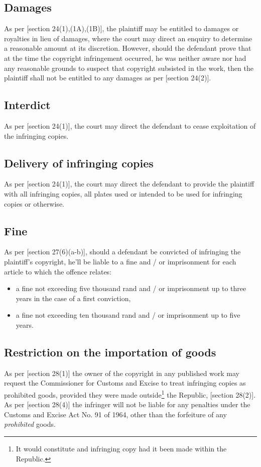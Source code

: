 \documentclass[11pt]{article}
\begin{document}
\subsection{Damages}
\label{sec:org50e3e7f}
As per [section 24(1),(1A),(1B)]\cite{rsa78_copyrightact}, the plaintiff
may be entitled to damages or royalties in lieu of damages, where the court
may direct an enquiry to determine a reasonable amount at its
discretion. However, should the defendant prove that at the time the
copyright infringement occurred, he was neither aware nor had any reasonable
grounds to suspect that copyright subsisted in the work, then the plaintiff
shall not be entitled to any damages as per [section 24(2)]\cite{rsa78_copyrightact}.
\subsection{Interdict}
\label{sec:org68ed5d1}
As per [section 24(1)]\cite{rsa78_copyrightact}, the court may direct the
defendant to cease exploitation of the infringing copies.
\subsection{Delivery of infringing copies}
\label{sec:org018a9f0}
As per [section 24(1)]\cite{rsa78_copyrightact}, the court may direct the
defendant to provide the plaintiff with all infringing copies, all plates
used or intended to be used for infringing copies or otherwise.
\subsection{Fine}
\label{sec:org67448b5}
As per [section 27(6)(a-b)]\cite{rsa78_copyrightact}, should a defendant be
convicted of infringing the plaintiff's copyright, he'll be liable to a fine
and / or imprisonment for each article to which the offence relates:
\begin{itemize}
\item a fine not exceeding five thousand rand and / or imprisonment up to three
years in the case of a first conviction,
\item a fine not exceeding ten thousand rand and / or imprisonment up to five years.
\end{itemize}
\subsection{Restriction on the importation of goods}
\label{sec:orgc7acb13}
As per [section 28(1)]\cite{rsa78_copyrightact} the owner of the copyright in
any published work may request the Commissioner for Customs and Excise to
treat infringing copies as prohibited goods, provided they were made
outside\footnote{It would constitute and infringing copy had it been made within
the Republic.} the Republic, [section 28(2)]. As per [section
28(4)]\cite{rsa78_copyrightact} the infringer will not be liable for any
penalties under the Customs and Excise Act No. 91 of 1964, other than the
forfeiture of any \emph{prohibited} goods.
\printbibliography
\end{document}
